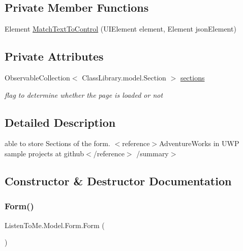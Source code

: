 \subsection*{Private Member Functions}
\begin{DoxyCompactItemize}
\item 
Element \mbox{\hyperlink{class_listen_to_me_1_1_model_1_1_form_a6a232d7bcb2cff3bd69cdb149c3dd485}{Match\+Text\+To\+Control}} (U\+I\+Element element, Element json\+Element)
\end{DoxyCompactItemize}
\subsection*{Private Attributes}
\begin{DoxyCompactItemize}
\item 
Observable\+Collection$<$ Class\+Library.\+model.\+Section $>$ \mbox{\hyperlink{class_listen_to_me_1_1_model_1_1_form_a4b5d6fd20dc2522f3ad05614958c9895}{sections}}
\begin{DoxyCompactList}\small\item\em flag to determine whether the page is loaded or not \end{DoxyCompactList}\end{DoxyCompactItemize}


\subsection{Detailed Description}
able to store Sections of the form. $<$reference$>$Adventure\+Works in U\+WP sample projects at github$<$/reference$>$ /summary$>$ 

\subsection{Constructor \& Destructor Documentation}
\mbox{\label{class_listen_to_me_1_1_model_1_1_form_ae0301066625a452b488a25365cf369d0}} 
\subsubsection{\texorpdfstring{Form()}{Form()}}
{\footnotesize\ttfamily Listen\+To\+Me.\+Model.\+Form.\+Form (\begin{DoxyParamCaption}{ }\end{DoxyParamCaption})}



